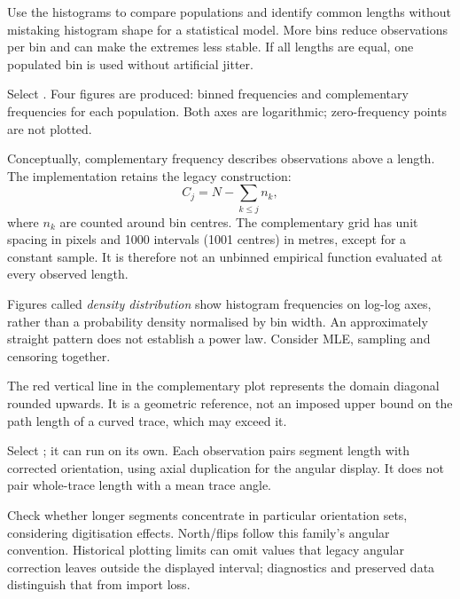 Use the histograms to compare populations and identify common lengths without mistaking histogram shape for a statistical model. More bins reduce observations per bin and can make the extremes less stable. If all lengths are equal, one populated bin is used without artificial jitter.

Select . Four figures are produced: binned frequencies and complementary frequencies for each population. Both axes are logarithmic; zero-frequency points are not plotted.

Conceptually, complementary frequency describes observations above a length. The implementation retains the legacy construction:
\begin{equation}
C_j=N-\sum_{k\leq j} n_k,
\end{equation}
where \(n_k\) are counted around bin centres. The complementary grid has unit spacing in pixels and 1000 intervals (1001 centres) in metres, except for a constant sample. It is therefore not an unbinned empirical function evaluated at every observed length.

Figures called \emph{density distribution} show histogram frequencies on log-log axes, rather than a probability density normalised by bin width. An approximately straight pattern does not establish a power law. Consider MLE, sampling and censoring together.

The red vertical line in the complementary plot represents the domain diagonal rounded upwards. It is a geometric reference, not an imposed upper bound on the path length of a curved trace, which may exceed it.

Select ; it can run on its own. Each observation pairs segment length with corrected orientation, using axial duplication for the angular display. It does not pair whole-trace length with a mean trace angle.

Check whether longer segments concentrate in particular orientation sets, considering digitisation effects. North/flips follow this family's angular convention. Historical plotting limits can omit values that legacy angular correction leaves outside the displayed interval; diagnostics and preserved data distinguish that from import loss.


